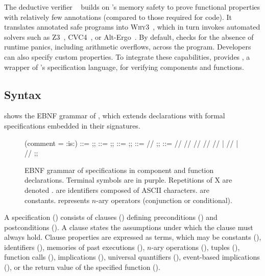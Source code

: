 The deductive verifier \Creusot~\cite{DBLP:conf/icfem/DenisJM22} builds on \Rust's memory safety to
prove functional properties with relatively few annotations (compared to those required for \Ci
code). It translates annotated safe \Rust programs into
\textsc{Why3}~\cite{DBLP:conf/esop/FilliatreP13}, which in turn invokes automated solvers such as
Z3~\cite{DBLP:conf/tacas/MouraB08}, CVC4~\cite{DBLP:conf/cav/BarrettCDHJKRT11}, or
Alt-Ergo~\cite{conchon2018alt}. By default, \Creusot checks for the absence of runtime panics,
including arithmetic overflows, across the program. Developers can also specify custom properties.
To integrate these capabilities, \GRust provides \GReusot, a wrapper of \Creusot's specification
language, for verifying \GRSync components and functions.

\subsection{Syntax}
\label{sec:grust:greusot:syntax}

 shows the EBNF grammar of \GReusot, which extends \GRSync declarations
with formal specifications embedded in their signatures.

\begin{figure}[!ht]
  \centering
  \begin{bnf}(comment = {:is:})
    \FunItem ::= \funItem{\ID}{\many{(\ID \: \kft{:} \: \TY)}}{\TY}{\many{\Decl}} ;;
    \CompItem ::= \compItem{\ID}{\many{(\ID \: \kft{:} \: \STY)}}{\many{(\ID \: \kft{:} \: \STY)}}{\many{\Eq}} ;;
    \Spec ::= \many{\Clause} ;;
    \Clause ::= \reqClause{\Term} // \ensClause{\Term} ;;
    \Term ::= \CST // \ID // \lastExpr{\ID} // \opExpr{\many{\Term}} // \tuple{\Term} // \appExpr{\ID}{\many{\Term}}
    | \implTerm{\Term}{\Term} // \forallTerm{\ID}{\TY}{\Term}
    | \whenTerm{\EPat}{\Term} // \resTerm ;;
  \end{bnf}
  \caption[EBNF grammar of \GReusot specifications.]
  {EBNF grammar of \GReusot specifications in component and function declarations.
    Terminal symbols are in purple.
    Repetitions of X are denoted .
    \ID are identifiers composed of ASCII characters.
    \CST are constants.
    \OP represents $n$-ary operators (\eg conjunction or conditional).}
  \label{fig:syntax:greusot}
\end{figure}

A specification (\Spec) consists of clauses (\many{\Clause}) defining preconditions
() and postconditions (). A  clause states the assumptions
under which the  clause must always hold. Clause properties are expressed as terms,
which may be constants (\CST), identifiers (\ID), memories of past executions (\lastExpr{\ID}),
$n$-ary operations (\opExpr{\many{\Term}}), tuples (\tuple{\Term}), function calls
(\appExpr{\ID}{\many{\Term}}), implications (\implTerm{\Term}{\Term}), universal quantifiers
(\forallTerm{\ID}{\TY}{\Term}), event-based implications (\whenTerm{\EPat}{\Term}), or the return
value of the specified function (\resTerm).

